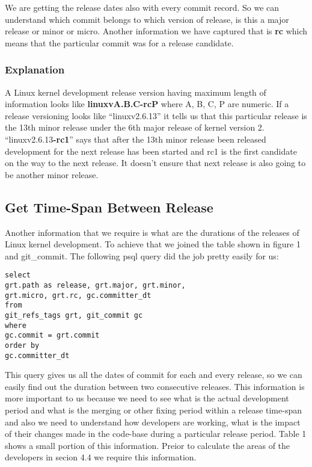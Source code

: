 \documentclass{acm_proc_article-sp}
\begin{document}
We are getting the release dates also with every commit record. So we can understand which commit belongs to which version of release, is this a major release or minor or micro. Another information we have captured that is \textbf{rc} which means that the particular commit was for a release candidate.

\subsubsection{Explanation}
A Linux kernel development release version having maximum length of information looks like \textbf{linuxvA.B.C-rcP} where A, B, C, P are numeric. If a release versioning looks like ``linuxv2.6.13'' it tells us that this particular release is the 13th minor release  under  the 6th major release of kernel version 2. ``linuxv2.6.13\textbf{-rc1}'' says that after the 13th minor release been released development for the next release has been started and rc1 is the first candidate on the way to the next release. It doesn't ensure that next release is also going to be another minor release.

\subsection{Get Time-Span Between Release}
Another information that we require is what are the durations of the releases of Linux kernel development. To achieve that we joined the table shown in figure 1 and git\_commit. The following psql query did the job pretty easily for us:
\begin{lstlisting}
select
grt.path as release, grt.major, grt.minor,
grt.micro, grt.rc, gc.committer_dt
from
git_refs_tags grt, git_commit gc
where
gc.commit = grt.commit
order by
gc.committer_dt
\end{lstlisting}
This query gives us all the dates of commit for each and every release, so we can easily find out the duration between two consecutive releases. This information is more important to us because we need to see what is the actual development period and what is the merging or other fixing period within a release time-span and also we need to understand how developers are working, what is the impact of their changes made in the code-base during a particular release period. Table 1 shows a small portion of this information. Preior to calculate the areas of the developers in secion 4.4 we require this information.
\end{document}
